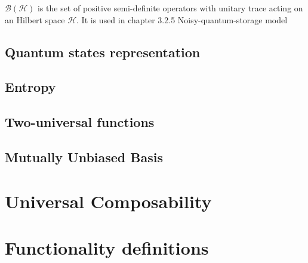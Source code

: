 $\mathcal{B}(\mathcal{H})$ is the set of positive semi-definite operators with unitary trace acting on an Hilbert space $\mathcal{H}$. {\cv It is used in chapter 3.2.5 Noisy-quantum-storage model}

\subsection{Quantum states representation}

\subsection{Entropy}

\subsection{Two-universal functions}

\subsection{Mutually Unbiased Basis}




\section{Universal Composability}


\section{Functionality definitions}


%
%
%
